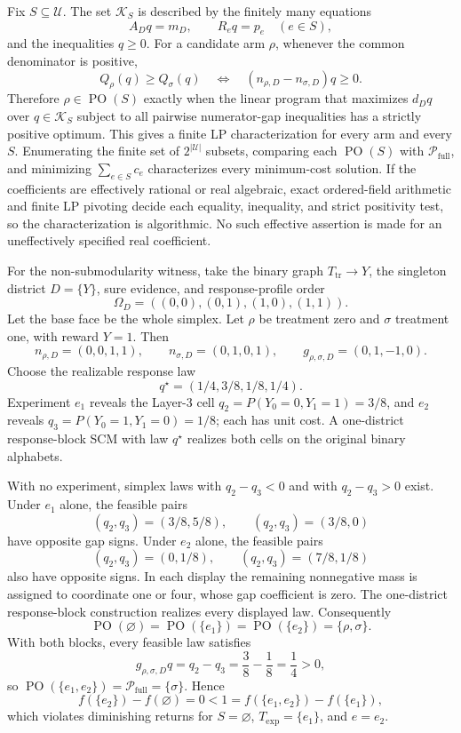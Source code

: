 Fix \(S\subseteq\mathcal U\). The set \(\mathcal K_S\) is described by the finitely many equations
\[
A_Dq=m_D,
\qquad R_eq=p_e\quad(e\in S),
\]
and the inequalities \(q\geq0\). For a candidate arm \(\rho\), whenever the common denominator is positive,
\[
Q_\rho(q)\geq Q_\sigma(q)
\quad\Longleftrightarrow\quad
(n_{\rho,D}-n_{\sigma,D})q\geq0.
\]
Therefore \(\rho\in\operatorname{PO}(S)\) exactly when the linear program that maximizes \(d_Dq\) over \(q\in\mathcal K_S\) subject to all pairwise numerator-gap inequalities has a strictly positive optimum. This gives a finite LP characterization for every arm and every \(S\). Enumerating the finite set of \(2^{|\mathcal U|}\) subsets, comparing each \(\operatorname{PO}(S)\) with \(\mathcal P_{\mathrm{full}}\), and minimizing \(\sum_{e\in S}c_e\) characterizes every minimum-cost solution. If the coefficients are effectively rational or real algebraic, exact ordered-field arithmetic and finite LP pivoting decide each equality, inequality, and strict positivity test, so the characterization is algorithmic. No such effective assertion is made for an uneffectively specified real coefficient.

For the non-submodularity witness, take the binary graph \(T_{\mathrm{tr}}\to Y\), the singleton district \(D=\{Y\}\), sure evidence, and response-profile order
\[
\Omega_D=((0,0),(0,1),(1,0),(1,1)).
\]
Let the base face be the whole simplex. Let \(\rho\) be treatment zero and \(\sigma\) treatment one, with reward \(Y=1\). Then
\[
n_{\rho,D}=(0,0,1,1),
\qquad n_{\sigma,D}=(0,1,0,1),
\qquad g_{\rho,\sigma,D}=(0,1,-1,0).
\]
Choose the realizable response law
\[
q^\star=(1/4,3/8,1/8,1/4).
\]
Experiment \(e_1\) reveals the Layer-3 cell \(q_2=P(Y_0=0,Y_1=1)=3/8\), and \(e_2\) reveals \(q_3=P(Y_0=1,Y_1=0)=1/8\); each has unit cost. A one-district response-block SCM with law \(q^\star\) realizes both cells on the original binary alphabets.

With no experiment, simplex laws with \(q_2-q_3<0\) and with \(q_2-q_3>0\) exist. Under \(e_1\) alone, the feasible pairs
\[
(q_2,q_3)=(3/8,5/8),
\qquad (q_2,q_3)=(3/8,0)
\]
have opposite gap signs. Under \(e_2\) alone, the feasible pairs
\[
(q_2,q_3)=(0,1/8),
\qquad (q_2,q_3)=(7/8,1/8)
\]
also have opposite signs. In each display the remaining nonnegative mass is assigned to coordinate one or four, whose gap coefficient is zero. The one-district response-block construction realizes every displayed law. Consequently
\[
\operatorname{PO}(\varnothing)=\operatorname{PO}(\{e_1\})
=\operatorname{PO}(\{e_2\})=\{\rho,\sigma\}.
\]
With both blocks, every feasible law satisfies
\[
g_{\rho,\sigma,D}q=q_2-q_3=\frac38-\frac18=\frac14>0,
\]
so \(\operatorname{PO}(\{e_1,e_2\})=\mathcal P_{\mathrm{full}}=\{\sigma\}\). Hence
\[
f(\{e_2\})-f(\varnothing)=0
<1=f(\{e_1,e_2\})-f(\{e_1\}),
\]
which violates diminishing returns for \(S=\varnothing\), \(T_{\mathrm{exp}}=\{e_1\}\), and \(e=e_2\).

